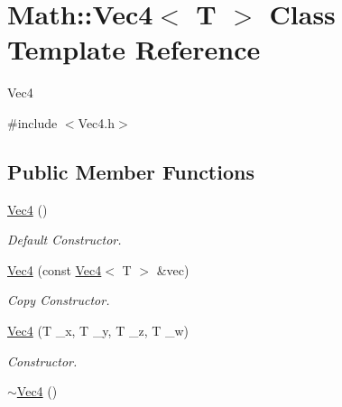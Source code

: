 \hypertarget{classMath_1_1Vec4}{
\section{Math::Vec4$<$ T $>$ Class Template Reference}
\label{classMath_1_1Vec4}
}


Vec4  


{\ttfamily \#include $<$Vec4.h$>$}\subsection*{Public Member Functions}
\begin{DoxyCompactItemize}
\item 
\hypertarget{classMath_1_1Vec4_a118a372bbe8dbc3935cc100312f6a125}{
\hyperlink{classMath_1_1Vec4_a118a372bbe8dbc3935cc100312f6a125}{Vec4} ()}
\label{classMath_1_1Vec4_a118a372bbe8dbc3935cc100312f6a125}

\begin{DoxyCompactList}\small\item\em Default Constructor. \item\end{DoxyCompactList}\item 
\hypertarget{classMath_1_1Vec4_a99dcc5e47bc6bd4a68025c29e95fb260}{
\hyperlink{classMath_1_1Vec4_a99dcc5e47bc6bd4a68025c29e95fb260}{Vec4} (const \hyperlink{classMath_1_1Vec4}{Vec4}$<$ T $>$ \&vec)}
\label{classMath_1_1Vec4_a99dcc5e47bc6bd4a68025c29e95fb260}

\begin{DoxyCompactList}\small\item\em Copy Constructor. \item\end{DoxyCompactList}\item 
\hypertarget{classMath_1_1Vec4_a06271f3ed0b2f9314a28b63445e7887c}{
\hyperlink{classMath_1_1Vec4_a06271f3ed0b2f9314a28b63445e7887c}{Vec4} (T \_\-x, T \_\-y, T \_\-z, T \_\-w)}
\label{classMath_1_1Vec4_a06271f3ed0b2f9314a28b63445e7887c}

\begin{DoxyCompactList}\small\item\em Constructor. \item\end{DoxyCompactList}\item 
\hypertarget{classMath_1_1Vec4_a1119676f1871896f55d726ab7b40e73f}{
\hyperlink{classMath_1_1Vec4_a1119676f1871896f55d726ab7b40e73f}{$\sim$Vec4} ()}
\label{classMath_1_1Vec4_a1119676f1871896f55d726ab7b40e73f}


\end{DoxyCompactItemize}

